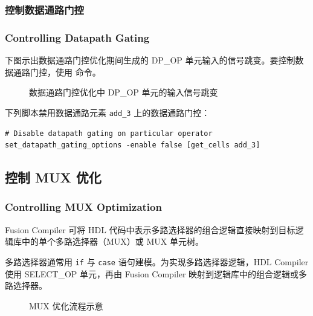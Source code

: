 \subsubsection{控制数据通路门控}
\subsubsection*{Controlling Datapath Gating}

下图示出数据通路门控优化期间生成的 DP\_OP 单元输入的信号跳变。要控制数据通路门控，使用  命令。

\begin{figure}[htbp]
\centering
{}
\caption{数据通路门控优化中 DP\_OP 单元的输入信号跳变}
\label{fig:datapath-gating}
\end{figure}

下列脚本禁用数据通路元素 \texttt{add\_3} 上的数据通路门控：
\begin{lstlisting}
# Disable datapath gating on particular operator
set_datapath_gating_options -enable false [get_cells add_3]
\end{lstlisting}

\subsection{控制 MUX 优化}
\subsubsection*{Controlling MUX Optimization}

Fusion Compiler 可将 HDL 代码中表示多路选择器的组合逻辑直接映射到目标逻辑库中的单个多路选择器（MUX）或 MUX 单元树。

多路选择器通常用 \texttt{if} 与 \texttt{case} 语句建模。为实现多路选择器逻辑，HDL Compiler 使用 SELECT\_OP 单元，再由 Fusion Compiler 映射到逻辑库中的组合逻辑或多路选择器。

\begin{figure}[htbp]
\centering
{}
\caption{MUX 优化流程示意}
\label{fig:mux-opt-flow}
\end{figure}


